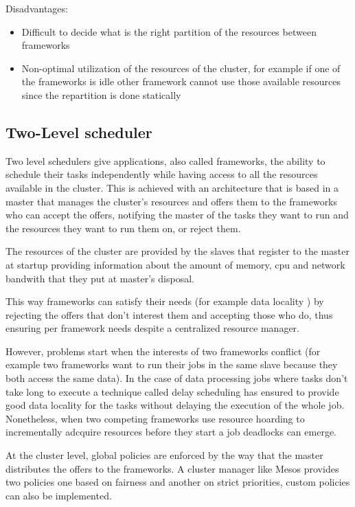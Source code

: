 \documentclass{svjour3}                     %
\begin{document}
Disadvantages:

\begin{itemize}
  \item Difficult to decide what is the right partition of the resources
between frameworks
  \item Non-optimal utilization of the resources of the cluster, for example
if one of the frameworks is idle other framework cannot use those
available resources since the repartition is done statically
\end{itemize}

\subsection{Two-Level scheduler}

Two level schedulers give applications, also called
frameworks, the ability to schedule their tasks independently while
having access to all the resources available in the cluster. This
is achieved with an architecture that is based in a master that manages
the cluster's resources and offers them to the frameworks who can accept 
the offers, notifying the master of the tasks they want to run and the
resources they want to run them on, or reject them.

The resources of the cluster are provided by the slaves that register to 
the master at startup providing information about the amount of memory, cpu
and network bandwith that they put at master's disposal.  

This way frameworks can satisfy their needs (for example data locality \cite{chung_maximizing_2006} ) by 
rejecting the offers that don't interest them and accepting those who do, thus
ensuring per framework needs despite a centralized resource manager. 

However, problems start when the interests of two frameworks conflict 
(for example two frameworks want to run their jobs in the same slave because 
they both access the same data). In the case of data processing jobs where tasks
don't take long to execute a technique called delay scheduling \cite{zaharia_delay_2010} has ensured to
provide good data locality for the tasks without delaying the execution of the whole
job. Nonetheless, when two competing frameworks use resource hoarding to incrementally 
adcquire resources before they start a job deadlocks can emerge.

At the cluster level, global policies are enforced by the way that the master 
distributes the offers to the frameworks. A cluster manager like Mesos \cite{Hindman10mesos:a} provides two
policies one based on fairness \cite{AjtaiANRSW1998} and another on strict priorities, custom policies can
also be implemented.
\end{document}
